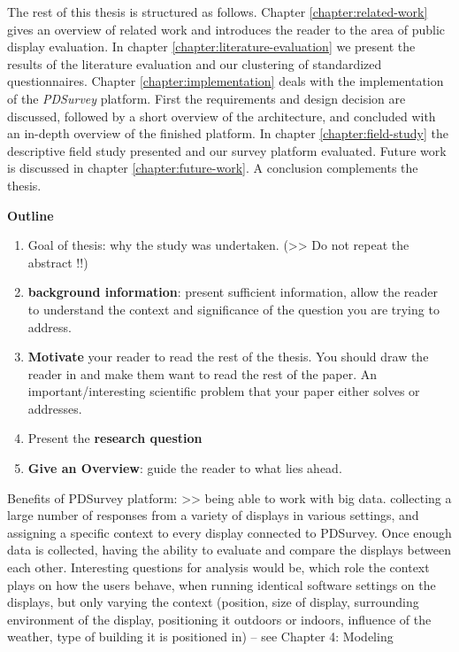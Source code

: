 	The rest of this thesis is structured as follows. Chapter \ref{chapter:related-work} gives an overview of related work and introduces the reader to the area of public display evaluation. In chapter \ref{chapter:literature-evaluation} we present the results of the literature evaluation and our clustering of standardized questionnaires. Chapter \ref{chapter:implementation} deals with the implementation of the \textit{PDSurvey} platform. First the requirements and design decision are discussed, followed by a short overview of the architecture, and concluded with an in-depth overview of the finished platform. In chapter \ref{chapter:field-study} the descriptive field study presented and our survey platform evaluated. Future work is discussed in chapter \ref{chapter:future-work}. A conclusion complements the thesis.









\clearpage

\textbf{Outline}

	\begin{enumerate}

		\item Goal of thesis: why the study was undertaken. (>> Do not repeat the abstract !!)

		\item \textbf{background information}: present sufficient information, allow the reader to understand the context and significance of the question you are trying to address. 

		\item \textbf{Motivate} your reader to read the rest of the thesis. You should draw the reader in and make them want to read the rest of the paper. An important/interesting scientific problem that your paper either solves or addresses.

		\item Present the \textbf{research question}

		\item \textbf{Give an Overview}: guide the reader to what lies ahead. 

	\end{enumerate}




	Benefits of PDSurvey platform:
	>>  being able to work with big data. collecting a large number of responses from a variety of displays in various settings, and assigning a specific context to every display connected to PDSurvey. Once enough data is collected, having the ability to evaluate and compare the displays between each other. Interesting questions for analysis would be, which role the context plays on how the users behave, when running identical software settings on the displays, but only varying the context (position, size of display, surrounding environment of the display, positioning it outdoors or indoors, influence of the weather, type of building it is positioned in) -- see Chapter 4: Modeling




